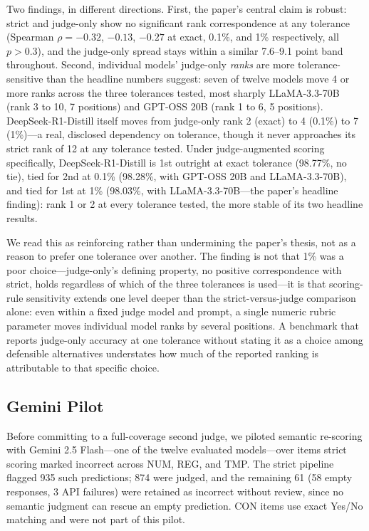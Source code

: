 Two findings, in different directions. First, the paper's central claim is robust: strict and
judge-only show no significant rank correspondence at any tolerance (Spearman $\rho = -0.32$,
$-0.13$, $-0.27$ at exact, 0.1\%, and 1\% respectively, all $p > 0.3$), and the judge-only spread
stays within a similar 7.6--9.1 point band throughout. Second, individual models' judge-only
\emph{ranks} are more tolerance-sensitive than the headline numbers suggest: seven of twelve models
move 4 or more ranks across the three tolerances tested, most sharply LLaMA-3.3-70B (rank 3 to 10, 7
positions) and GPT-OSS 20B (rank 1 to 6, 5 positions). DeepSeek-R1-Distill itself moves from
judge-only rank 2 (exact) to 4 (0.1\%) to 7 (1\%)---a real, disclosed dependency on tolerance,
though it never approaches its strict rank of 12 at any tolerance tested. Under judge-augmented
scoring specifically, DeepSeek-R1-Distill is 1st outright at exact tolerance (98.77\%, no tie),
tied for 2nd at 0.1\% (98.28\%, with GPT-OSS 20B and LLaMA-3.3-70B), and tied for 1st at 1\% (98.03\%,
with LLaMA-3.3-70B---the paper's headline finding): rank 1 or 2 at every tolerance tested, the more
stable of its two headline results.

We read this as reinforcing rather than undermining the paper's thesis, not as a reason to prefer
one tolerance over another. The finding is not that 1\% was a poor choice---judge-only's defining
property, no positive correspondence with strict, holds regardless of which of the three tolerances
is used---it is that scoring-rule sensitivity extends one level deeper than the strict-versus-judge
comparison alone: even within a fixed judge model and prompt, a single numeric rubric parameter
moves individual model ranks by several positions. A benchmark that reports judge-only accuracy at
one tolerance without stating it as a choice among defensible alternatives understates how much of
the reported ranking is attributable to that specific choice.

\subsection{Gemini Pilot}

Before committing to a full-coverage second judge, we piloted semantic re-scoring with Gemini 2.5 Flash---one of the twelve evaluated models---over items strict scoring marked incorrect across NUM, REG, and TMP. The strict pipeline flagged 935 such predictions; 874 were judged, and the remaining 61 (58 empty responses, 3 API failures) were retained as incorrect without review, since no semantic judgment can rescue an empty prediction. CON items use exact Yes/No matching and were not part of this pilot.

